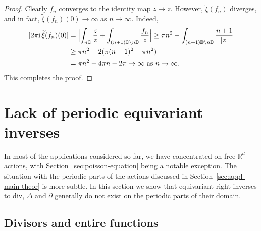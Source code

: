 \documentclass[12pt]{paper}
\numberwithin{equation}{section}
\theoremstyle{plain}
\theoremstyle{definition}
\newcommand{\D}{\mathbb{D}}
\newcommand{\Rd}{\mathbb{R}^{d}}
\newcommand{\im}{\mathrm{i}} %
\newcommand{\dm}{\mathrm{div}}      %
\begin{document}
\begin{proof}
  Clearly \(f_{n}\) converges to the identity map \(z \mapsto z\).  However,
  \(\widetilde{\xi}(f_{n})\) diverges, and in fact, \(\widetilde{\xi}(f_{n})(0) \to \infty\) as
  \(n \to \infty\).  Indeed,
  \begin{displaymath}
    \begin{aligned}
      |2\pi \im\, \widetilde{\xi}(f_{n})(0)|
      &= \Bigl|\int_{n\D}\frac{z}{z} + \int_{(n+1)\D \setminus n \D}
        \frac{f_{n}}{z}\Bigr| \ge \pi n^{2} - \int_{(n+1)\D \setminus n
        \D}\frac{n+1}{|z|} \\
      &\ge \pi n^{2} -
        2(\pi(n+1)^{2} - \pi n^{2}) \\
      &= \pi n^{2} - 4\pi n - 2\pi \to \infty \textrm{ as } n \to \infty.
    \end{aligned}
  \end{displaymath}
  This completes the proof.
\end{proof}

















\section{Lack of periodic equivariant inverses}
\label{sec:borel-inverses-1-periodic}

In most of the applications considered so far, we have concentrated on free \(\Rd\)-actions, with
Section~\ref{sec:poisson-equation} being a notable exception. The situation with the periodic parts
of the actions discussed in Section~\ref{sec:appl-main-theor} is more subtle.  In this section we
show that equivariant right-inverses to \(\dm\), \(\Delta\) and \(\bar{\partial}\) generally do not
exist on the periodic parts of their domain.

\subsection{Divisors and entire functions}
\label{sec:divis-merom-funct}
\end{document}
